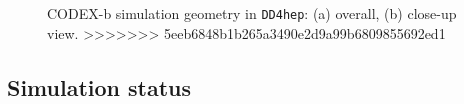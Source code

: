 \begin{figure}
{}
\caption{\label{fig:geo_dd4hep}
    CODEX-b simulation geometry in {\tt DD4hep}: (a) overall, (b) close-up view. 
>>>>>>> 5eeb6848b1b265a3490e2d9a99b6809855692ed1
}
\end{figure}


\subsection{Simulation status}


